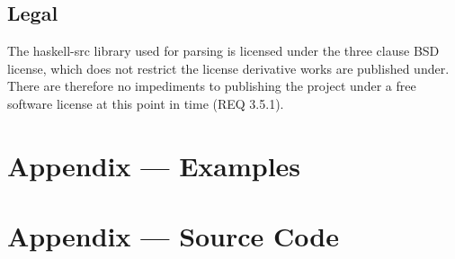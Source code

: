 \documentclass[english,onecolumn]{article}
\begin{document}
\subsection{Legal}
The haskell-src library used for parsing is licensed under the three clause BSD license, which does not restrict the license derivative works are published under. There are therefore no impediments to publishing the project under a free software license at this point in time (REQ 3.5.1).

\appendix
\lstset{basicstyle=\footnotesize}

\section{Appendix --- Examples}




\section{Appendix --- Source Code}







\end{document}
